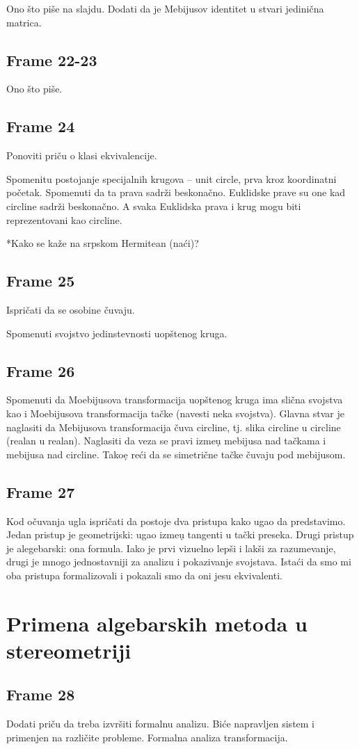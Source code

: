 \documentclass{article}
\begin{document}
Ono \v sto pi\v se na slajdu. Dodati da je Mebijusov identitet u stvari 
jedini\v cna matrica.

\subsection{Frame 22-23}

Ono \v sto pi\v se.

\subsection{Frame 24}

Ponoviti pri\v cu o klasi ekvivalencije.

Spomenitu postojanje specijalnih krugova -- unit circle, prva kroz koordinatni 
po\v cetak. Spomenuti da ta prava sadr\v zi beskona\v cno. Euklidske prave su 
one kad circline sadr\v zi beskona\v cno. A svaka Euklidska prava i krug mogu 
biti reprezentovani kao circline.

*Kako se ka\v ze na srpskom Hermitean (na\'ci)?

\subsection{Frame 25}

Ispri\v cati da se osobine \v cuvaju.

Spomenuti svojstvo jedinstevnosti uop\v stenog kruga.

\subsection{Frame 26}

Spomenuti da Moebijusova transformacija uop\v stenog kruga ima sli\v cna 
svojstva kao i Moebijusova transformacija ta\v cke (navesti neka svojstva). 
Glavna stvar je naglasiti da Mebijusova transformacija \v cuva circline, tj. 
slika circline u circline (realan u realan). Naglasiti da veza se pravi izme\d 
u mebijusa nad ta\v ckama i mebijusa nad circline. Tako\d e re\'ci da se 
simetri\v cne ta\v cke \v cuvaju pod mebijusom.

\subsection{Frame 27}

Kod o\v cuvanja ugla ispri\v cati da postoje dva pristupa kako ugao da 
predstavimo. Jedan pristup je geometrijski: ugao izme\d u tangenti u ta\v cki 
preseka. Drugi pristup je alegebarski: ona formula. Iako je prvi vizuelno lep\v 
si i lak\v si za razumevanje, drugi je mnogo jednostavniji za analizu i 
pokazivanje svojstava. Ista\'ci da smo mi oba pristupa formalizovali i pokazali 
smo da oni jesu ekvivalenti.

\section{Primena algebarskih metoda u stereometriji}

\subsection{Frame 28}
Dodati pri\v cu da treba izvr\v siti formalnu analizu. Bi\'ce napravljen sistem 
i primenjen na razli\v cite probleme. Formalna analiza transformacija.
\end{document}
